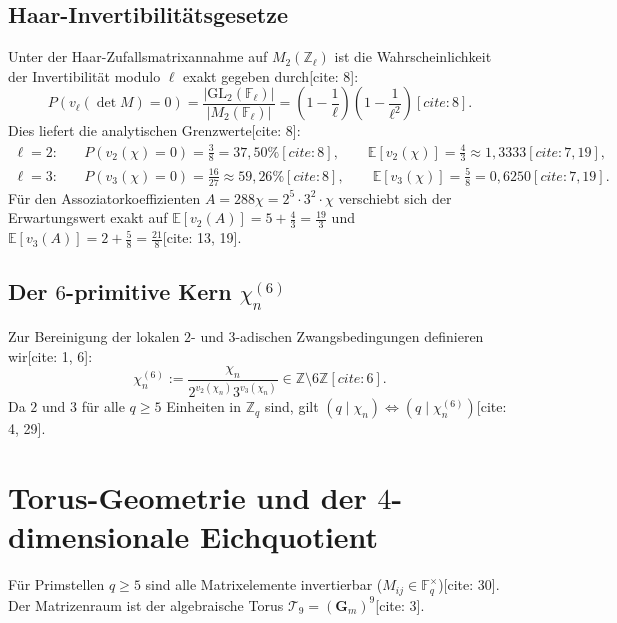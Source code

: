\documentclass[11pt,a4paper]{article}
\theoremstyle{definition}
\theoremstyle{remark}
\begin{document}
\subsection{Haar-Invertibilitätsgesetze}
Unter der Haar-Zufallsmatrixannahme auf $M_2(\mathbb{Z}_\ell)$ ist die Wahrscheinlichkeit der Invertibilität modulo $\ell$ exakt gegeben durch[cite: 8]:
\begin{equation}
P(v_\ell(\det M) = 0) = \frac{|\mathrm{GL}_2(\mathbb{F}_\ell)|}{|M_2(\mathbb{F}_\ell)|} = \left(1 - \frac{1}{\ell}\right)\left(1 - \frac{1}{\ell^2}\right)[cite: 8].
\end{equation}
Dies liefert die analytischen Grenzwerte[cite: 8]:
\begin{align}
\ell = 2: \quad & P(v_2(\chi) = 0) = \frac{3}{8} = 37{,}50\%[cite: 8], \qquad \mathbb{E}[v_2(\chi)] = \frac{4}{3} \approx 1{,}3333[cite: 7, 19], \\
\ell = 3: \quad & P(v_3(\chi) = 0) = \frac{16}{27} \approx 59{,}26\%[cite: 8], \qquad \mathbb{E}[v_3(\chi)] = \frac{5}{8} = 0{,}6250[cite: 7, 19].
\end{align}
Für den Assoziatorkoeffizienten $A = 288\chi = 2^5 \cdot 3^2 \cdot \chi$ verschiebt sich der Erwartungswert exakt auf $\mathbb{E}[v_2(A)] = 5 + \frac{4}{3} = \frac{19}{3}$ und $\mathbb{E}[v_3(A)] = 2 + \frac{5}{8} = \frac{21}{8}$[cite: 13, 19].

\subsection{Der $6$-primitive Kern $\chi_n^{(6)}$}
Zur Bereinigung der lokalen $2$- und $3$-adischen Zwangsbedingungen definieren wir[cite: 1, 6]:
\begin{equation}
\chi_n^{(6)} := \frac{\chi_n}{2^{v_2(\chi_n)} 3^{v_3(\chi_n)}} \in \mathbb{Z} \setminus 6\mathbb{Z}[cite: 6].
\end{equation}
Da $2$ und $3$ für alle $q \ge 5$ Einheiten in $\mathbb{Z}_q$ sind, gilt $(q \mid \chi_n) \iff (q \mid \chi_n^{(6)})$[cite: 4, 29].

\section{Torus-Geometrie und der $4$-dimensionale Eichquotient}

Für Primstellen $q \ge 5$ sind alle Matrixelemente invertierbar ($M_{ij} \in \mathbb{F}_q^\times$)[cite: 30]. Der Matrizenraum ist der algebraische Torus $\mathcal{T}_9 = (\mathbf{G}_m)^9$[cite: 3].
\end{document}
